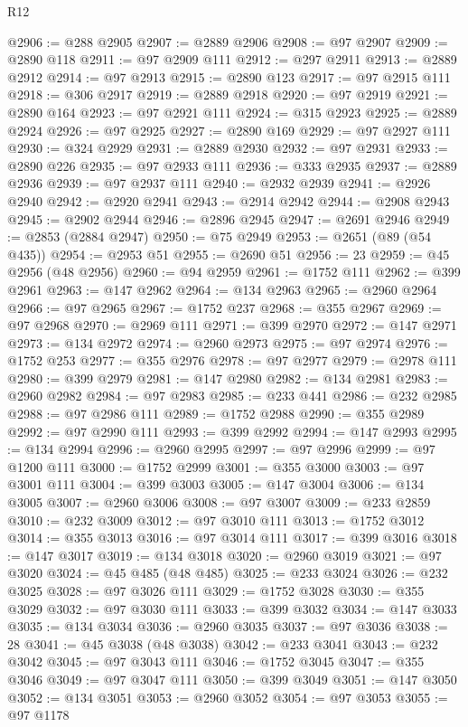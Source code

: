 \begin{lexlean}{R12}
\begin{coremodule}
{{{{{{{{{{{{{{{{{{{{{{{{{{{{{{{{{{{{{{{{{{{{{{{{{{{{{{{{{{{{{{{{{{{{{{{{{{{{{{{{{{@2906 := @288 @2905
@2907 := @2889 @2906
@2908 := @97 @2907
@2909 := @2890 @118
@2911 := @97 @2909 @111
@2912 := @297 @2911
@2913 := @2889 @2912
@2914 := @97 @2913
@2915 := @2890 @123
@2917 := @97 @2915 @111
@2918 := @306 @2917
@2919 := @2889 @2918
@2920 := @97 @2919
@2921 := @2890 @164
@2923 := @97 @2921 @111
@2924 := @315 @2923
@2925 := @2889 @2924
@2926 := @97 @2925
@2927 := @2890 @169
@2929 := @97 @2927 @111
@2930 := @324 @2929
@2931 := @2889 @2930
@2932 := @97 @2931
@2933 := @2890 @226
@2935 := @97 @2933 @111
@2936 := @333 @2935
@2937 := @2889 @2936
@2939 := @97 @2937 @111
@2940 := @2932 @2939
@2941 := @2926 @2940
@2942 := @2920 @2941
@2943 := @2914 @2942
@2944 := @2908 @2943
@2945 := @2902 @2944
@2946 := @2896 @2945
@2947 := @2691 @2946
@2949 := @2853 (@2884 @2947)
@2950 := @75 @2949
@2953 := @2651 (@89 (@54 @435))
@2954 := @2953 @51
@2955 := @2690 @51
@2956 := 23
@2959 := @45 @2956 (@48 @2956)
@2960 := @94 @2959
@2961 := @1752 @111
@2962 := @399 @2961
@2963 := @147 @2962
@2964 := @134 @2963
@2965 := @2960 @2964
@2966 := @97 @2965
@2967 := @1752 @237
@2968 := @355 @2967
@2969 := @97 @2968
@2970 := @2969 @111
@2971 := @399 @2970
@2972 := @147 @2971
@2973 := @134 @2972
@2974 := @2960 @2973
@2975 := @97 @2974
@2976 := @1752 @253
@2977 := @355 @2976
@2978 := @97 @2977
@2979 := @2978 @111
@2980 := @399 @2979
@2981 := @147 @2980
@2982 := @134 @2981
@2983 := @2960 @2982
@2984 := @97 @2983
@2985 := @233 @441
@2986 := @232 @2985
@2988 := @97 @2986 @111
@2989 := @1752 @2988
@2990 := @355 @2989
@2992 := @97 @2990 @111
@2993 := @399 @2992
@2994 := @147 @2993
@2995 := @134 @2994
@2996 := @2960 @2995
@2997 := @97 @2996
@2999 := @97 @1200 @111
@3000 := @1752 @2999
@3001 := @355 @3000
@3003 := @97 @3001 @111
@3004 := @399 @3003
@3005 := @147 @3004
@3006 := @134 @3005
@3007 := @2960 @3006
@3008 := @97 @3007
@3009 := @233 @2859
@3010 := @232 @3009
@3012 := @97 @3010 @111
@3013 := @1752 @3012
@3014 := @355 @3013
@3016 := @97 @3014 @111
@3017 := @399 @3016
@3018 := @147 @3017
@3019 := @134 @3018
@3020 := @2960 @3019
@3021 := @97 @3020
@3024 := @45 @485 (@48 @485)
@3025 := @233 @3024
@3026 := @232 @3025
@3028 := @97 @3026 @111
@3029 := @1752 @3028
@3030 := @355 @3029
@3032 := @97 @3030 @111
@3033 := @399 @3032
@3034 := @147 @3033
@3035 := @134 @3034
@3036 := @2960 @3035
@3037 := @97 @3036
@3038 := 28
@3041 := @45 @3038 (@48 @3038)
@3042 := @233 @3041
@3043 := @232 @3042
@3045 := @97 @3043 @111
@3046 := @1752 @3045
@3047 := @355 @3046
@3049 := @97 @3047 @111
@3050 := @399 @3049
@3051 := @147 @3050
@3052 := @134 @3051
@3053 := @2960 @3052
@3054 := @97 @3053
@3055 := @97 @1178
}}}}}}}}}}}}}}}}}}}}}}}}}}}}}}}}}}}}}}}}}}}}}}}}}}}}}}}}}}}}}}}}}}}}}}}}}}}}}}}}}}
\end{coremodule}
\end{lexlean}
